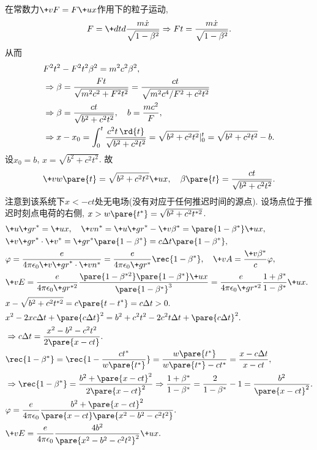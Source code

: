 \documentclass[hidelinks]{ctexart}
\begin{document}
\begin{sample}
    \begin{ex}
        在常数力$\+vF = F\+ux$作用下的粒子运动,
        \[ F = \+dtd{} \frac{m\dot{x}}{\sqrt{1-\beta^2}} \Rightarrow Ft = \frac{m\dot{x}}{\sqrt{1-\beta^2}}. \]
        从而
        \begin{align*}
            & F^2t^2 - F^2t^2\beta^2 = m^2c^2 \beta^2, \\
            & \Rightarrow \beta = \frac{Ft}{\sqrt{m^2c^2 + F^2t^2}} = \frac{ct}{\sqrt{m^2c^4/F^2 + c^2t^2}} \\
            & \Rightarrow \beta = \frac{ct}{\sqrt{b^2 + c^2t^2}},\quad b = \frac{mc^2}{F}, \\
            & \Rightarrow x-x_0 = \int_0^t \frac{c^2 t\,\rd{t}}{\sqrt{b^2 + c^2t^2}} = \sqrt{b^2 + c^2t^2}\vert_0^t = \sqrt{b^2 + c^2t^2} - b.
        \end{align*}
        设$x_0 = b$, $x = \sqrt{b^2+c^2t^2}$. 故
        \[ \+vw\pare{t} = \sqrt{b^2 + c^2t^2}\+ux,\quad \beta\pare{t} = \frac{ct}{\sqrt{b^2+c^2t^2}}. \]
        注意到该系统下$x<-ct$处无电场(没有对应于任何推迟时间的源点). 设场点位于推迟时刻点电荷的右侧, $x > w\pare{t^*} = \sqrt{b^2 + c^2t^{*2}}$.
        \begin{align*}
            & \+u{\+gr}^* = \+ux,\quad \+vn^* = \+u{\+gr}^* - \+v\beta^* = \pare{1-\beta^*}\+ux, \\
            & \+v{\+gr}^*\cdot \+v^* = \+gr^*\pare{1-\beta^*} = c\Delta t\pare{1-\beta^*}, \\
            & \varphi = \frac{e}{4\pi\epsilon_0 \+v{\+gr}^*\cdot \+vn^*} = \frac{e}{4\pi\epsilon_0 \+gr^*} \rec{1-\beta^*},\quad \+vA = \frac{\+v\beta^*}{c}\varphi, \\
            & \+vE = \frac{e}{4\pi\epsilon_0 \+gr^{*2}} \frac{\pare{1-\beta^{*2}}\pare{1-\beta^*}\+ux}{\pare{1-\beta^*}^3} = \frac{e}{4\pi\epsilon_0 \+gr^{*2}}\frac{1+\beta^*}{1-\beta^*}\+ux. \\
            & x - \sqrt{b^2 + c^2t^{*2}} = c\pare{t-t^*} = c\Delta t > 0. \\
            & x^2 - 2xc \Delta t + \pare{c\Delta t}^2 = b^2 + c^2t^2 - 2c^2t\Delta t + \pare{c\Delta t}^2. \\
            & \Rightarrow c\Delta t = \frac{x^2 - b^2 - c^2t^2}{2\pare{x-ct}}. \\
            & \rec{1-\beta^*} = \rec{1-\displaystyle \frac{ct^*}{w\pare{t^*}}} = \frac{w\pare{t^*}}{w\pare{t^*} - ct^*} = \frac{x-c\Delta t}{x-ct}, \\
            & \Rightarrow \rec{1-\beta^*} = \frac{b^2 + \pare{x-ct}^2}{2\pare{x-ct}^2} \Rightarrow \frac{1+\beta^*}{1-\beta^*} = \frac{2}{1-\beta^*} - 1 = \frac{b^2}{\pare{x-ct}^2}.\\
            & \varphi = \frac{e}{4\pi\epsilon_0}\frac{b^2 + \pare{x-ct}^2}{\pare{x-ct}\pare{x^2-b^2-c^2t^2}}. \\
            & \+vE = \frac{e}{4\pi\epsilon_0}\frac{4b^2}{\pare{x^2-b^2-c^2t^2}^2}\+ux.
        \end{align*}
    \end{ex}
\end{sample}
\end{document}
